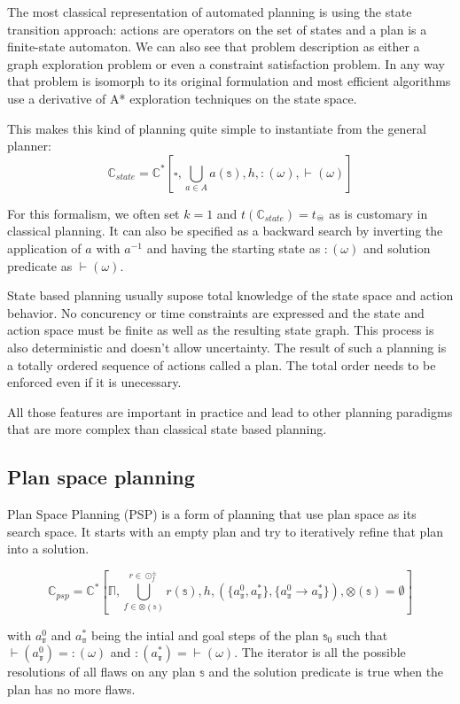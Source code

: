 \documentclass[11pt,a4paper,twoside,openright,titlepage,numbers=noenddot,headinclude,cleardoublepage=empty,openany]{scrreprt}
\theoremstyle{plain}
\theoremstyle{definition}
\theoremstyle{remark}
\newcommand{\bb}{\mathbb}
\begin{document}
The most classical representation of automated planning is using the
state transition approach: actions are operators on the set of states
and a plan is a finite-state automaton. We can also see that problem
description as either a graph exploration problem or even a constraint
satisfaction problem. In any way that problem is isomorph to its
original formulation and most efficient algorithms use a derivative of
A* exploration techniques on the state space.

This makes this kind of planning quite simple to instantiate from the
general planner:
\[\bb{C}_{state} = \bb{C}^* \left[ \square, \bigcup_{a \in A} a(\bb{s}), h, :(\omega), \vdash(\omega) \right]\]

For this formalism, we often set \(k=1\) and
\(t(\bb{C}_{state}) = t_\acidfree\) as is customary in classical
planning. It can also be specified as a backward search by inverting the
application of \(a\) with \(a^{-1}\) and having the starting state as
\(:(\omega)\) and solution predicate as \(\vdash(\omega)\).

State based planning usually supose total knowledge of the state space
and action behavior. No concurency or time constraints are expressed and
the state and action space must be finite as well as the resulting state
graph. This process is also deterministic and doesn't allow uncertainty.
The result of such a planning is a totally ordered sequence of actions
called a plan. The total order needs to be enforced even if it is
unecessary.

All those features are important in practice and lead to other planning
paradigms that are more complex than classical state based planning.

\hypertarget{plan-space-planning}{%
\subsection{Plan space planning}\label{plan-space-planning}}

Plan Space Planning (PSP) is a form of planning that use plan space as
its search space. It starts with an empty plan and try to iteratively
refine that plan into a solution.

\[\bb{C}_{psp} = \bb{C}^* \left[ \bb{\Pi}, \bigcup_{f \in \otimes(\bb{s})}^{r \in \odot^\pm_f} r(\bb{s}), h, \left(\{a_{\bb{\pi}}^0, a_{\bb{\pi}}^*\},\{a_{\bb{\pi}}^0\rightarrow a_{\bb{\pi}}^*\} \right), \otimes(\bb{s}) = \emptyset \right]\]

with \(a_{\bb{\pi}}^0\) and \(a_{\bb{\pi}}^*\) being the intial and goal
steps of the plan \(\bb{s}_0\) such that
\(\vdash(a_{\bb{\pi}}^0) = :(\omega)\) and
\(:(a_{\bb{\pi}}^*) = \vdash(\omega)\). The iterator is all the possible
resolutions of all flaws on any plan \(\bb{s}\) and the solution
predicate is true when the plan has no more flaws.
\end{document}
